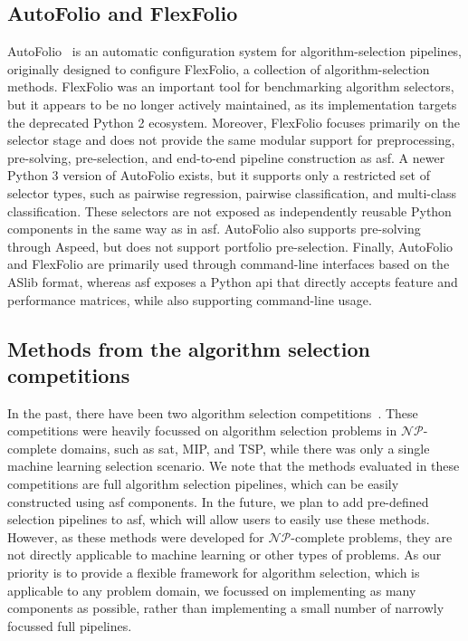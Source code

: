 \subsection{AutoFolio and FlexFolio}
AutoFolio~\citep{LinEtAl15} is an automatic configuration system for algorithm-selection pipelines, originally designed to configure FlexFolio, a collection of algorithm-selection methods. FlexFolio was an important tool for benchmarking algorithm selectors, but it appears to be no longer actively maintained, as its implementation targets the deprecated Python 2 ecosystem. Moreover, FlexFolio focuses primarily on the selector stage and does not provide the same modular support for preprocessing, pre-solving, pre-selection, and end-to-end pipeline construction as \gls{asf}.
A newer Python 3 version of AutoFolio exists, but it supports only a restricted set of selector types, such as pairwise regression, pairwise classification, and multi-class classification. These selectors are not exposed as independently reusable Python components in the same way as in \gls{asf}. AutoFolio also supports pre-solving through Aspeed, but does not support portfolio pre-selection. Finally, AutoFolio and FlexFolio are primarily used through command-line interfaces based on the ASlib format, whereas \gls{asf} exposes a Python \gls{api} that directly accepts feature and performance matrices, while also supporting command-line usage.
\subsection{Methods from the algorithm selection competitions}
In the past, there have been two algorithm selection competitions~\citep{LinEtAl19b}. These competitions were heavily focussed on algorithm selection problems in $\mathcal{NP}$-complete 
domains, such as \gls{sat}, MIP, and TSP, while there was only a single machine learning selection scenario.
We note that the methods evaluated in these competitions are full algorithm selection pipelines, which can be easily constructed using \gls{asf} components. In the future, we plan to add pre-defined selection pipelines to \gls{asf}, which will allow users to easily use these methods. However, as these methods were developed for $\mathcal{NP}$-complete problems, they are not directly applicable to machine learning or other types of problems. As our priority is to provide a flexible framework for algorithm selection, which is applicable to any problem domain, we focussed on implementing as many components as possible, rather than implementing a small number of narrowly focussed full pipelines.

